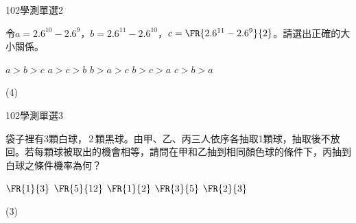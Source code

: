     \begin{QUESTION}
        \begin{ExamInfo}{102}{學測}{單選}{2}
        \end{ExamInfo}
        \begin{ExamAnsRateInfo}{66}{90}{72}{36}
        \end{ExamAnsRateInfo}
        \begin{QBODY}
            令$a={{2.6}^{10}}-{{2.6}^{9}}$，$b={{2.6}^{11}}-{{2.6}^{10}}$，$c=\FR{{{2.6}^{11}}-{{2.6}^{9}}}{2}$。請選出正確的大小關係。
			\begin{QOPS}
				\QOP $a>b>c$
				\QOP $a>c>b$
				\QOP $b>a>c$
				\QOP $b>c>a$
				\QOP $c>b>a$
			\end{QOPS}
        \end{QBODY}
        \begin{QFROMS}
        \end{QFROMS}
        \begin{QTAGS}\end{QTAGS}
        \begin{QANS}
            (4)
        \end{QANS}
        \begin{QSOLLIST}
        \end{QSOLLIST}
        \begin{QEMPTYSPACE}
        \end{QEMPTYSPACE}
    \end{QUESTION}
    \begin{QUESTION}
        \begin{ExamInfo}{102}{學測}{單選}{3}
        \end{ExamInfo}
        \begin{ExamAnsRateInfo}{35}{67}{26}{12}
        \end{ExamAnsRateInfo}
        \begin{QBODY}
            袋子裡有3顆白球，$\,2\,$顆黑球。由甲、乙、丙三人依序各抽取1顆球，抽取後不放回。若每顆球被取出的機會相等，請問在甲和乙抽到相同顏色球的條件下，丙抽到白球之條件機率為何？
			\begin{QOPS}
				\QOP $\FR{1}{3}$	
				\QOP $\FR{5}{12}$	
				\QOP $\FR{1}{2}$
				\QOP $\FR{3}{5}$	
				\QOP $\FR{2}{3}$
			\end{QOPS}
        \end{QBODY}
        \begin{QFROMS}
        \end{QFROMS}
        \begin{QTAGS}\end{QTAGS}
        \begin{QANS}
            (3)
        \end{QANS}
        \begin{QSOLLIST}
        \end{QSOLLIST}
        \begin{QEMPTYSPACE}
        \end{QEMPTYSPACE}
    \end{QUESTION}
